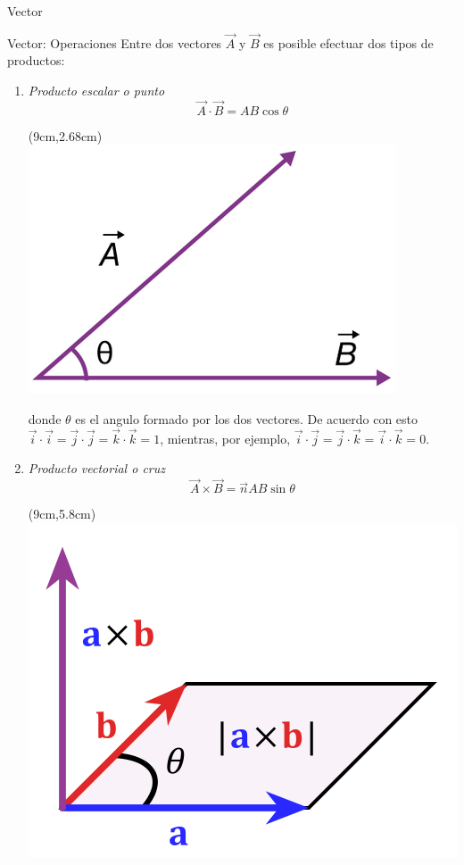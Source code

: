 \documentclass [xcolor=svgnames, t] {beamer}
\begin{document}
\begin{frame}{Vector}
\vspace{-0.5cm}
\begin{block}{Vector: Operaciones}
Entre dos vectores $\vec{A}$ y $\vec{B}$ es posible efectuar dos tipos de productos:
\begin{enumerate}
\item \emph{Producto escalar o punto}
\vspace{0.3cm}
$$
\vec{A}\cdot \vec{B} = AB \cos \theta
$$
\begin{textblock*}{3cm}(9cm,2.68cm) %
\includegraphics[width=\textwidth]{pes}
\end{textblock*}
donde $\theta$ es el angulo formado por los dos vectores. De acuerdo con esto $\vec{i} \cdot \vec{i} = \vec{j} \cdot \vec{j}= \vec{k} \cdot \vec{k} = 1$, mientras, por ejemplo, $\vec{i} \cdot \vec{j} = \vec{j} \cdot \vec{k} =\vec{i} \cdot \vec{k} = 0$.
\item \emph{Producto vectorial o cruz}
$$
\vec{A} \times \vec{B} = \vec{n}AB \sin \theta
$$
\begin{textblock*}{3cm}(9cm,5.8cm) %
\includegraphics[width=\textwidth]{crop}

\end{textblock*}
\end{enumerate}
\end{block}
\end{frame}
\end{document}
